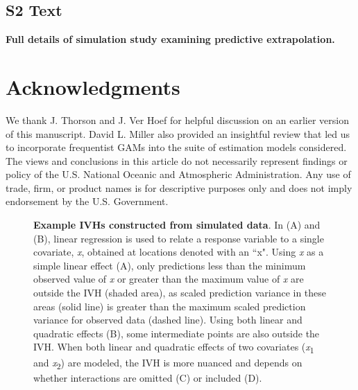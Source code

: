 \documentclass[10pt,letterpaper]{article}
\begin{document}
\subsection*{S2 Text}
\label{S2_Text}
{\bf Full details of simulation study examining predictive extrapolation.}

\section*{Acknowledgments}
We thank J. Thorson and J. Ver Hoef for helpful discussion on an earlier version of this manuscript.  David L. Miller also provided an insightful review that led us to incorporate frequentist GAMs into the suite of estimation models considered. The views and conclusions in this article do not necessarily represent findings or policy of the U.S. National Oceanic and Atmospheric Administration.  Any use of trade, firm, or product names is for descriptive purposes only and does not imply endorsement by the U.S. Government.

\nolinenumbers

%
%
%





\begin{figure}[!h]
\caption{{\bf Example IVHs constructed from simulated data}.  In (A) and (B), linear regression is used to relate a response variable to a single covariate, \textit{x}, obtained at locations denoted with an ``x".  Using \textit{x} as a simple linear effect (A), only predictions less than the minimum observed value of \textit{x} or greater than the maximum value of \textit{x} are outside the IVH (shaded area), as scaled prediction variance in these areas (solid line) is greater than the maximum scaled prediction variance for observed data (dashed line).  Using both linear and quadratic effects (B), some intermediate points are also outside the IVH.  When both linear and quadratic effects of two covariates (\textit{x}\textsubscript{1} and \textit{x}\textsubscript{2}) are modeled, the IVH is more nuanced and depends on whether interactions are omitted (C) or included (D). }
\label{fig:IVH}
\end{figure}
\end{document}

